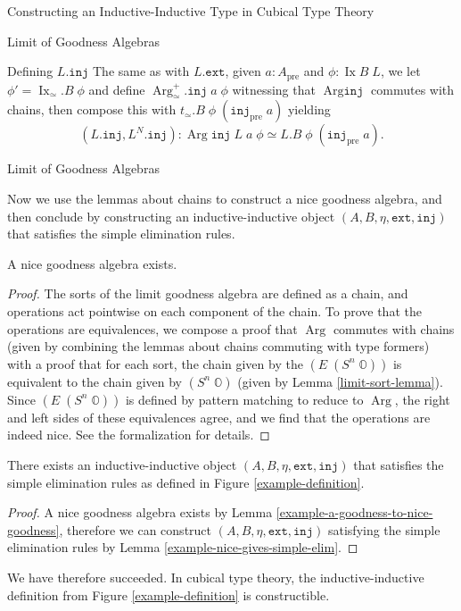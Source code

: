 \documentclass[runningheads]{llncs}
\DeclareMathOperator{\Arg}{Arg}
\DeclareMathOperator{\Ix}{Ix}
\newcommand{\pre}[1]{{#1}_\text{pre}}
\newcommand{\bbO}{\mathbb{O}}
\newcommand{\join}{\texttt{ext}}
\newcommand{\inj}{\texttt{inj}}
\begin{document}
\begin{section}{Constructing an Inductive-Inductive Type in Cubical Type Theory}
\begin{subsection}{Limit of Goodness Algebras}
{\begin{subsubsection}{Defining $L.\inj$}
The same as with $L.\join$, given $a : \pre{A}$ and $\phi : \Ix B\;L$, we let $\phi' = \Ix_\simeq.B\;\phi$ and define $\Arg_\simeq^+.\inj\;a\;\phi$ witnessing that $\Arg\inj$ commutes with chains, then compose this with $t_\simeq.B\;\phi\;(\pre{\inj}\;a)$ yielding \[(L.\inj, L^N.\inj) : \Arg\inj\;L\;a\;\phi \simeq L.B\;\phi\;(\pre{\inj}\;a).\]
\end{subsubsection}
}

\begin{subsubsection}{Limit of Goodness Algebras}

Now we use the lemmas about chains to construct a nice goodness algebra, and then conclude by constructing an inductive-inductive object $(A,B,\eta,\join,\inj)$ that satisfies the simple elimination rules.

\begin{lemma}\label{example-a-goodness-to-nice-goodness}
    A nice goodness algebra exists.
\end{lemma}
\begin{proof}
    The sorts of the limit goodness algebra are defined as a chain, and operations act pointwise on each component of the chain. To prove that the operations are equivalences, we compose a proof that $\Arg$ commutes with chains (given by combining the lemmas about chains commuting with type formers) with a proof that for each sort, the chain given by the $(E\;(S^n\;\bbO))$ is equivalent to the chain given by $(S^n\;\bbO)$ (given by Lemma \ref{limit-sort-lemma}). Since $(E\;(S^n\;\bbO))$ is defined by pattern matching to reduce to $\Arg$, the right and left sides of these equivalences agree, and we find that the operations are indeed nice. See the formalization for details.
\end{proof}

\begin{theorem}\label{example-constructed-II}
    There exists an inductive-inductive object $(A, B, \eta, \join, \inj)$ that satisfies the simple elimination rules as defined in Figure \ref{example-definition}.
\end{theorem}
\begin{proof}
    A nice goodness algebra exists by Lemma \ref{example-a-goodness-to-nice-goodness}, therefore we can construct $(A, B, \eta, \join, \inj)$ satisfying the simple elimination rules by Lemma \ref{example-nice-gives-simple-elim}.
\end{proof}

We have therefore succeeded. In cubical type theory, the inductive-inductive definition from Figure \ref{example-definition} is constructible.

\end{subsubsection}

\end{subsection}

\end{section}
\end{document}
